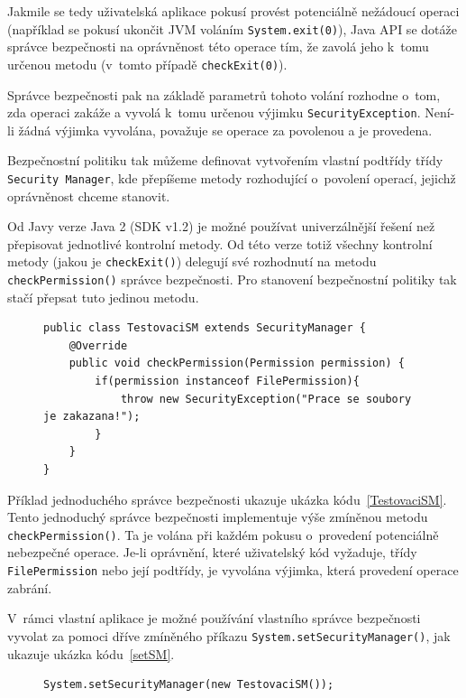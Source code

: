Jakmile se tedy uživatelská aplikace pokusí provést potenciálně nežádoucí operaci (například se pokusí ukončit JVM voláním {\tt System.exit(0)}),
Java API se dotáže správce bezpečnosti na oprávněnost této operace tím, že zavolá jeho k~tomu určenou metodu (v~tomto případě {\tt checkExit(0)}).~\cite{oaks}

Správce bezpečnosti pak na základě parametrů tohoto volání rozhodne o~tom, zda operaci zakáže a vyvolá k~tomu určenou výjimku {\tt SecurityException}.
Není-li žádná výjimka vyvolána, považuje se operace za povolenou a je provedena.~\cite{oaks}

Bezpečnostní politiku tak můžeme definovat vytvořením vlastní podtřídy třídy {\tt Security Manager}, kde přepíšeme metody rozhodující o~povolení
operací, jejichž oprávněnost chceme stanovit.

Od Javy verze Java 2 (SDK v1.2) je možné používat univerzálnější řešení než přepisovat jednotlivé kontrolní metody.
Od této verze totiž všechny kontrolní metody (jakou je {\tt checkExit()}) delegují své rozhodnutí na metodu {\tt checkPermission()} správce bezpečnosti.
Pro stanovení bezpečnostní politiky tak stačí přepsat tuto jedinou metodu.~\cite{refSecurityManager}

\begin{figure}[b!]
\begin{lstlisting}[caption=Jednoduchý správce bezpečnosti, label=TestovaciSM]
public class TestovaciSM extends SecurityManager {
	@Override
	public void checkPermission(Permission permission) {
		if(permission instanceof FilePermission){
			throw new SecurityException("Prace se soubory je zakazana!");
		}
	}
}
\end{lstlisting}
\end{figure}

Příklad jednoduchého správce bezpečnosti ukazuje ukázka kódu~\ref{TestovaciSM}.
Tento jednoduchý správce bezpečnosti implementuje výše zmíněnou metodu {\tt checkPermission()}.
Ta je volána při každém pokusu o~provedení potenciálně nebezpečné operace.
Je-li oprávnění, které uživatelský kód vyžaduje, třídy {\tt FilePermission} nebo její podtřídy, je vyvolána výjimka, která provedení operace zabrání.

V~rámci vlastní aplikace je možné používání vlastního správce bezpečnosti vyvolat za pomoci dříve zmíněného příkazu {\tt System.setSecurityManager()}, jak ukazuje ukázka kódu~\ref{setSM}.

\begin{figure}[tbh]
\begin{lstlisting}[caption=Nastavení vlastního správce bezpečnosti zevnitř JVM, label=setSM]
System.setSecurityManager(new TestovaciSM());
\end{lstlisting}
\end{figure}

